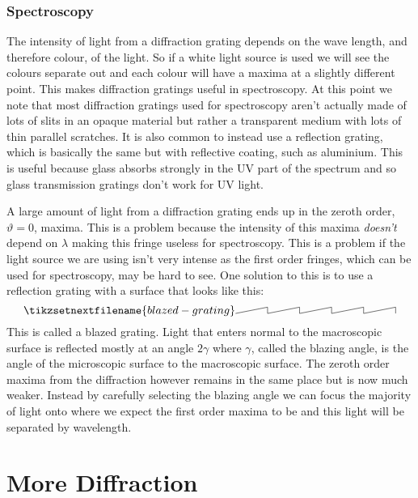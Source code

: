 \documentclass[a4paper]{article}
\begin{document}
    \subsubsection{Spectroscopy}
    The intensity of light from a diffraction grating depends on the wave length, and therefore colour, of the light.
    So if a white light source is used we will see the colours separate out and each colour will have a maxima at a slightly different point.
    This makes diffraction gratings useful in spectroscopy.
    At this point we note that most diffraction gratings used for spectroscopy aren't actually made of lots of slits in an opaque material but rather a transparent medium with lots of thin parallel scratches.
    It is also common to instead use a reflection grating, which is basically the same but with reflective coating, such as aluminium.
    This is useful because glass absorbs strongly in the UV part of the spectrum and so glass transmission gratings don't work for UV light.
    
    A large amount of light from a diffraction grating ends up in the zeroth order, \(\vartheta = 0\), maxima.
    This is a problem because the intensity of this maxima \emph{doesn't} depend on \(\lambda\) making this fringe useless for spectroscopy.
    This is a problem if the light source we are using isn't very intense as the first order fringes, which can be used for spectroscopy, may be hard to see.
    One solution to this is to use a reflection grating with a surface that looks like this:
    \[\tikzsetnextfilename{blazed-grating}
        \tikz{
            \foreach \x in {1, 2, ..., 5} {
                \draw (\x, 0) -- (\x+1, 0.2) -- (\x+1, 0);
            }
        }
    \]
    This is called a blazed grating.
    Light that enters normal to the macroscopic surface is reflected mostly at an angle \(2\gamma\) where \(\gamma\), called the blazing angle, is the angle of the microscopic surface to the macroscopic surface.
    The zeroth order maxima from the diffraction however remains in the same place but is now much weaker.
    Instead by carefully selecting the blazing angle we can focus the majority of light onto where we expect the first order maxima to be and this light will be separated by wavelength.
    
    \section{More Diffraction}
\end{document}
